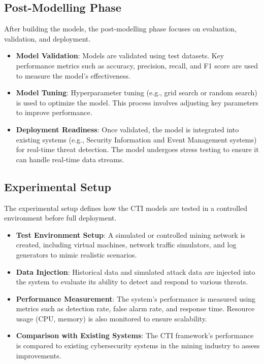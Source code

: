 \documentclass[a4paper,twoside,12pt]{report}
\begin{document}
\subsection{Post-Modelling Phase}
After building the models, the post-modelling phase focuses on evaluation, validation, and deployment.

\begin{itemize}
    \item \textbf{Model Validation}: Models are validated using test datasets. Key performance metrics such as accuracy, precision, recall, and F1 score are used to measure the model’s effectiveness.
    \item \textbf{Model Tuning}: Hyperparameter tuning (e.g., grid search or random search) is used to optimize the model. This process involves adjusting key parameters to improve performance.
    \item \textbf{Deployment Readiness}: Once validated, the model is integrated into existing systems (e.g., Security Information and Event Management systems) for real-time threat detection. The model undergoes stress testing to ensure it can handle real-time data streams.
\end{itemize}

\subsection{Experimental Setup}
The experimental setup defines how the CTI models are tested in a controlled environment before full deployment.

\begin{itemize}
    \item \textbf{Test Environment Setup}: A simulated or controlled mining network is created, including virtual machines, network traffic simulators, and log generators to mimic realistic scenarios.
    \item \textbf{Data Injection}: Historical data and simulated attack data are injected into the system to evaluate its ability to detect and respond to various threats.
    \item \textbf{Performance Measurement}: The system’s performance is measured using metrics such as detection rate, false alarm rate, and response time. Resource usage (CPU, memory) is also monitored to ensure scalability.
    \item \textbf{Comparison with Existing Systems}: The CTI framework’s performance is compared to existing cybersecurity systems in the mining industry to assess improvements.
\end{itemize}
\end{document}

